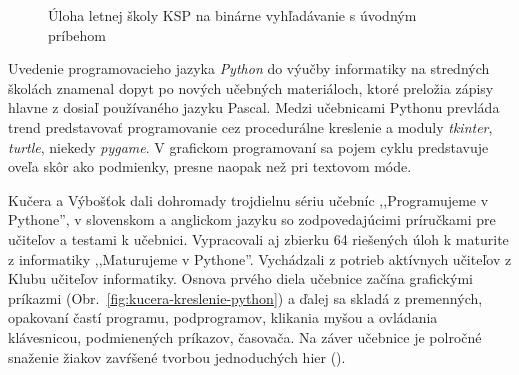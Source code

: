 \begin{figure}[h]
\centering
{}
\caption{Úloha letnej školy KSP na binárne vyhľadávanie s úvodným príbehom}
\label{fig:ksp-oblecenie}
\end{figure}

Uvedenie programovacieho jazyka \emph{Python} do výučby informatiky na stredných školách znamenal dopyt po nových učebných materiáloch, ktoré preložia zápisy hlavne z dosiaľ používaného jazyku Pascal. Medzi učebnicami Pythonu prevláda trend predstavovať programovanie cez procedurálne kreslenie a moduly \emph{tkinter}, \emph{turtle}, niekedy \emph{pygame}. V grafickom programovaní sa pojem cyklu predstavuje oveľa skôr ako podmienky, presne naopak než pri textovom móde.

Kučera a Výbošťok dali dohromady trojdielnu sériu učebníc ,,Programujeme v Pythone'', v slovenskom a anglickom jazyku so zodpovedajúcimi príručkami pre učiteľov a testami k učebnici. Vypracovali aj zbierku 64 riešených úloh k maturite z informatiky ,,Maturujeme v Pythone''. Vychádzali z potrieb aktívnych učiteľov z Klubu učiteľov informatiky. Osnova prvého diela učebnice začína grafickými príkazmi (Obr.~\ref{fig:kucera-kreslenie-python}) a ďalej sa skladá z premenných, opakovaní častí programu, podprogramov, klikania myšou a ovládania klávesnicou, podmienených príkazov, časovača. Na záver učebnice je polročné snaženie žiakov zavŕšené tvorbou jednoduchých hier (\cite{kucera_programujeme_2016}). 

